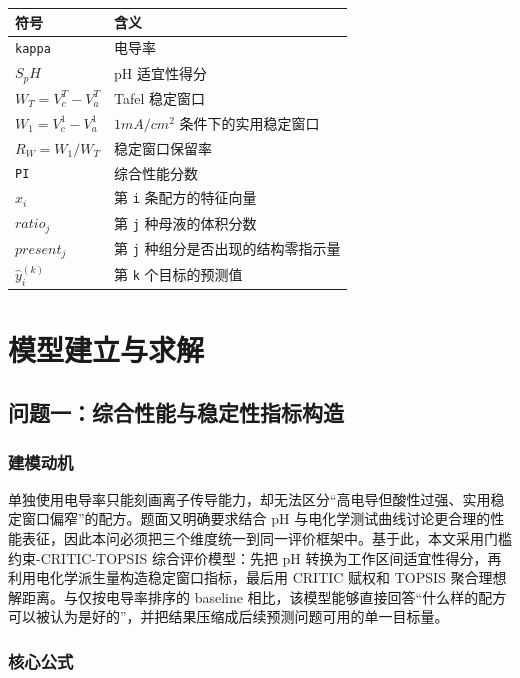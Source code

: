 \documentclass[bwprint]{gmcmthesis}
\numberwithin{figure}{section}
\begin{document}
\begin{table}[htbp]
\centering
\small
\begin{tabularx}{\textwidth}{>{\raggedright\arraybackslash}X>{\raggedright\arraybackslash}X}
\toprule
符号 & 含义 \\
\midrule
\texttt{kappa} & 电导率 \\
$S_pH$ & pH 适宜性得分 \\
$W_T = V_c^T - V_a^T$ & Tafel 稳定窗口 \\
$W_1 = V_c^1 - V_a^1$ & $1 mA/cm^2$ 条件下的实用稳定窗口 \\
$R_W = W_1 / W_T$ & 稳定窗口保留率 \\
\texttt{PI} & 综合性能分数 \\
$x_i$ & 第 \texttt{i} 条配方的特征向量 \\
$ratio_j$ & 第 \texttt{j} 种母液的体积分数 \\
$present_j$ & 第 \texttt{j} 种组分是否出现的结构零指示量 \\
$\hat y_i^{(k)}$ & 第 \texttt{k} 个目标的预测值 \\
\bottomrule
\end{tabularx}
\end{table}

\section{模型建立与求解}

\subsection{问题一：综合性能与稳定性指标构造}

\subsubsection{建模动机}

单独使用电导率只能刻画离子传导能力，却无法区分“高电导但酸性过强、实用稳定窗口偏窄”的配方。题面又明确要求结合 pH 与电化学测试曲线讨论更合理的性能表征，因此本问必须把三个维度统一到同一评价框架中。基于此，本文采用门槛约束-CRITIC-TOPSIS 综合评价模型：先把 pH 转换为工作区间适宜性得分，再利用电化学派生量构造稳定窗口指标，最后用 CRITIC 赋权和 TOPSIS 聚合理想解距离。与仅按电导率排序的 baseline 相比，该模型能够直接回答“什么样的配方可以被认为是好的”，并把结果压缩成后续预测问题可用的单一目标量。\par

\subsubsection{核心公式}
\end{document}
